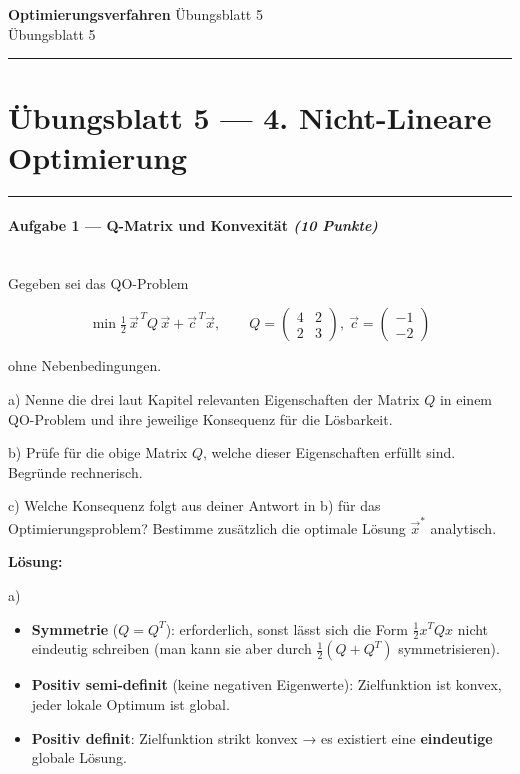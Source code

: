 \documentclass[11pt, a4paper]{article}
\providecommand{\nichttitle}{Übungsblatt}
\providecommand{\nichtsubtitle}{}
\renewcommand{\nichttitle}{Optimierungsverfahren}
\renewcommand{\nichtsubtitle}{Übungsblatt 5}
\begin{document}
\begin{center}
{\Large\bfseries\color{accent}\nichttitle}
\ifx\nichtsubtitle\empty\else
  \\[2pt]{\normalsize\color{accent!80!black}\nichtsubtitle}
\fi
\\[2pt]
\color{accent}\rule{0.4\linewidth}{0.8pt}\color{black}
\end{center}
\vspace{4pt}


\section{Übungsblatt 5 — 4. Nicht-Lineare Optimierung}


\noindent\textcolor{rulegray}{\rule{\linewidth}{0.4pt}}


\paragraph{Aufgabe 1 — Q-Matrix und Konvexität \textit{(10 Punkte)}}\mbox{}\\[2pt]

Gegeben sei das QO-Problem


\[
\min \tfrac{1}{2}\,\vec{x}^{\,T} Q\, \vec{x} + \vec{c}^{\,T}\vec{x}, \qquad Q = \begin{pmatrix} 4 & 2 \\ 2 & 3 \end{pmatrix},\ \vec{c} = \begin{pmatrix} -1 \\ -2 \end{pmatrix}
\]


ohne Nebenbedingungen.


a) Nenne die drei laut Kapitel relevanten Eigenschaften der Matrix $Q$ in einem QO-Problem und ihre jeweilige Konsequenz für die Lösbarkeit.

b) Prüfe für die obige Matrix $Q$, welche dieser Eigenschaften erfüllt sind. Begründe rechnerisch.

c) Welche Konsequenz folgt aus deiner Antwort in b) für das Optimierungsproblem? Bestimme zusätzlich die optimale Lösung $\vec{x}^*$ analytisch.


\textbf{Lösung:}


a)

\begin{itemize}
  \item \textbf{Symmetrie} ($Q = Q^T$): erforderlich, sonst lässt sich die Form $\tfrac{1}{2}x^TQx$ nicht eindeutig schreiben (man kann sie aber durch $\tfrac{1}{2}(Q+Q^T)$ symmetrisieren).
  \item \textbf{Positiv semi-definit} (keine negativen Eigenwerte): Zielfunktion ist konvex, jeder lokale Optimum ist global.
  \item \textbf{Positiv definit}: Zielfunktion strikt konvex → es existiert eine \textbf{eindeutige} globale Lösung.
\end{itemize}
\end{document}
